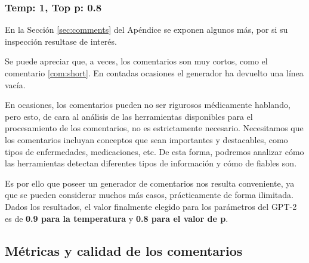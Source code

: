 \subsubsection{Temp: 1, Top p: 0.8}
\begin{thm}
\end{thm}
\begin{thm}
\end{thm}

En la Sección \ref{sec:comments} del Apéndice se exponen algunos más, por si su inspección resultase de interés. 

Se puede apreciar que, a veces, los comentarios son muy cortos, como el comentario \ref{com:short}. En contadas ocasiones el generador ha devuelto una línea vacía. 

En ocasiones, los comentarios pueden no ser rigurosos médicamente hablando, pero esto, de cara al análisis de las herramientas disponibles para el procesamiento de los comentarios, no es estrictamente necesario. Necesitamos que los comentarios incluyan conceptos que sean importantes y destacables, como tipos de enfermedades, medicaciones, etc. De esta forma, podremos analizar cómo las herramientas detectan diferentes tipos de información y cómo de fiables son. 

Es por ello que poseer un generador de comentarios nos resulta conveniente, ya que se pueden considerar muchos más casos, prácticamente de forma ilimitada. Dados los resultados, el valor finalmente elegido para los parámetros del GPT-2 es de \textbf{0.9 para la temperatura} y \textbf{0.8 para el valor de p}.

\subsection{Métricas y calidad de los comentarios}

